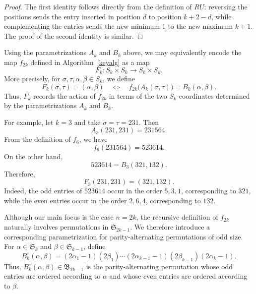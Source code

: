 \documentclass[12pt]{amsart}
\theoremstyle{definition}
\numberwithin{equation}{section}
\begin{document}
\begin{proof}
The first identity follows directly from the definition of $RU$: reversing the
positions sends the entry inserted in position $d$ to position
$k+2-d$, while complementing the entries sends the new minimum $1$
to the new maximum $k+1$. The proof of the second identity is similar.
\end{proof}

Using the parametrizations $A_k$ and $B_k$ above, we may equivalently
encode the map $f_{2k}$ defined in Algorithm~\ref{keyalg} as a map
\begin{equation*}
F_k:S_k\times S_k\longrightarrow S_k\times S_k.
\end{equation*}
More precisely, for $\sigma,\tau,\alpha,\beta\in S_k$, we define
\begin{equation}
F_k(\sigma,\tau)=(\alpha,\beta)
\quad\Longleftrightarrow\quad
f_{2k}\bigl(A_k(\sigma,\tau)\bigr)=B_k(\alpha,\beta).
\end{equation}
Thus, $F_k$ records the action of $f_{2k}$ in terms of the two
$S_k$-coordinates determined by the parametrizations $A_k$ and $B_k$.

For example, let $k=3$ and take $\sigma=\tau=231$. Then
\begin{equation*}
A_3(231,231)=231564.
\end{equation*}
From the definition of $f_6$, we have
\begin{equation*}
f_6(231564)=523614.
\end{equation*}
On the other hand,
\begin{equation*}
523614=B_3(321,132).
\end{equation*}
Therefore,
\begin{equation*}
F_3(231,231)=(321,132).
\end{equation*}
Indeed, the odd entries of $523614$ occur in the order $5,3,1$,
corresponding to $321$, while the even entries occur in the order
$2,6,4$, corresponding to $132$.

Although our main focus is the case $n=2k$, the recursive definition
of $f_{2k}$ naturally involves permutations in $\mathfrak{S}_{2k-1}$.
We therefore introduce a corresponding parametrization for
parity-alternating permutations of odd size. For
$\alpha\in \mathfrak{S}_k$ and $\beta\in \mathfrak{S}_{k-1}$, define
\begin{equation}\label{def:B circ}
B_k^\circ(\alpha,\beta)
=
(2\alpha_1-1)(2\beta_1)
\cdots
(2\alpha_{k-1}-1)(2\beta_{k-1})
(2\alpha_k-1).
\end{equation}
Thus, $B_k^\circ(\alpha,\beta)\in \mathfrak B_{2k-1}$ is the
parity-alternating permutation whose odd entries are ordered according
to $\alpha$ and whose even entries are ordered according to $\beta$.
\end{document}
